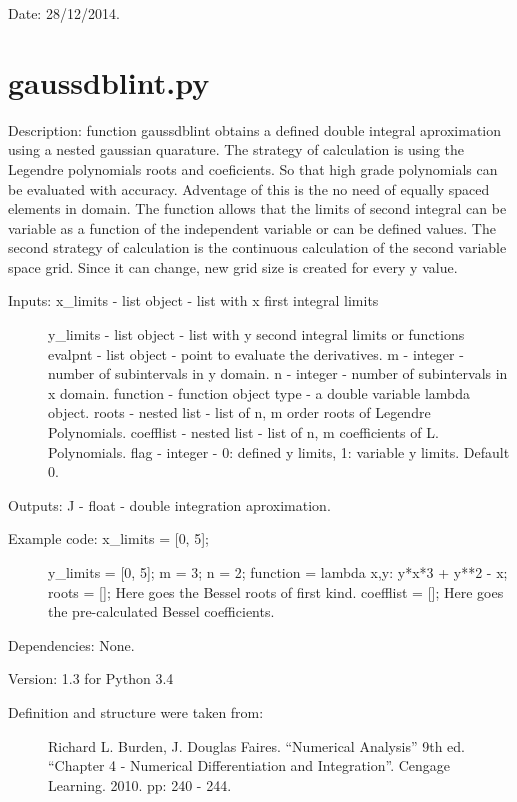 \documentclass[letterpaper,10pt,oneside]{sphinxmanual}
\theoremstyle{plain}%
\theoremstyle{definition}%
\theoremstyle{remark}%
\begin{document}
Date: 28/12/2014.


\section{gaussdblint.py}
\label{code:module-gaussdblint}\label{code:gaussdblint-py}
Description: function gaussdblint obtains a defined double integral 
aproximation using a nested gaussian quarature. The strategy of calculation
is using the Legendre polynomials roots and coeficients. So that high grade 
polynomials can be evaluated with accuracy. Adventage of this is the no
need of equally spaced elements in domain. The function allows that the
limits of second integral can be variable as a function of the independent
variable or can be defined values. The second strategy of calculation is
the continuous calculation of the second variable space grid. Since
it can change, new grid size is created for every y value.
\begin{description}
\item[{Inputs: x\_limits - list object - list with x first integral limits}] \leavevmode
y\_limits - list object - list with y second integral limits or functions
evalpnt - list object - point to evaluate the derivatives.
m - integer - number of subintervals in y domain.
n - integer - number of subintervals in x domain.
function - function object type - a double variable lambda object.
roots - nested list - list of n, m order roots of Legendre Polynomials.
coefflist - nested list - list of n, m coefficients of L. Polynomials.
flag - integer - 0: defined y limits, 1: variable y limits. Default 0.

\end{description}

Outputs: J - float - double integration aproximation.
\begin{description}
\item[{Example code: x\_limits = {[}0, 5{]};}] \leavevmode
y\_limits = {[}0, 5{]};
m = 3;
n = 2;
function = lambda x,y: y*x*3 + y**2 - x;
roots = {[}{]}; Here goes the Bessel roots of first kind.
coefflist = {[}{]}; Here goes the pre-calculated Bessel coefficients.

\end{description}

Dependencies: None.

Version: 1.3 for Python 3.4
\begin{description}
\item[{Definition and structure were taken from:}] \leavevmode
Richard L. Burden, J. Douglas Faires. ``Numerical Analysis'' 9th ed.
``Chapter 4 - Numerical Differentiation and Integration''. 
Cengage Learning. 2010. pp: 240 - 244.

\end{description}
\end{document}
